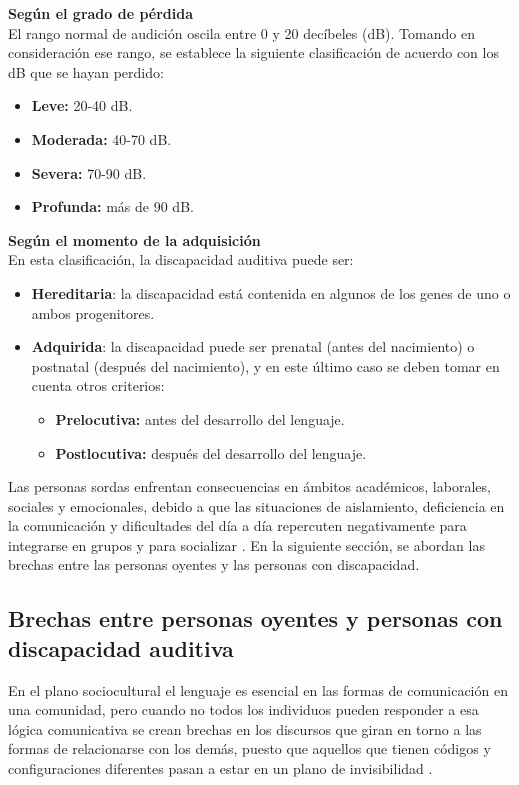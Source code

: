 \newpage
\textbf{Según el grado de pérdida}\\
El rango normal de audición oscila entre 0 y 20 decíbeles (dB). Tomando en consideración ese rango, se establece la siguiente clasificación de acuerdo con los dB que se hayan perdido:

\begin{itemize}
    \item \textbf{Leve:} 20-40 dB.  
    \item \textbf{Moderada:} 40-70 dB.  
    \item \textbf{Severa:} 70-90 dB.  
    \item \textbf{Profunda:} más de 90 dB.  
\end{itemize}

\textbf{Según el momento de la adquisición}\\
En esta clasificación, la discapacidad auditiva puede ser:

\begin{itemize}
    \item \textbf{Hereditaria}: la discapacidad está contenida en algunos de los genes de uno o ambos progenitores.  
    \item \textbf{Adquirida}: la discapacidad puede ser prenatal (antes del nacimiento) o postnatal (después del nacimiento), y en este último caso se deben tomar en cuenta otros criterios:
        \begin{itemize}
        \item \textbf{Prelocutiva:} antes del desarrollo del lenguaje.  
        \item \textbf{Postlocutiva:} después del desarrollo del lenguaje.  
        \end{itemize}
    \end{itemize}

Las personas sordas enfrentan consecuencias en ámbitos académicos, laborales, sociales y emocionales, debido a que las situaciones de aislamiento, deficiencia en la comunicación y dificultades del día a día repercuten negativamente para integrarse en grupos y para socializar \cite{ref29}. En la siguiente sección, se abordan las brechas entre las personas oyentes y las personas con discapacidad.

\subsection{Brechas entre personas oyentes y personas con discapacidad auditiva}
En el plano sociocultural el lenguaje es esencial en las formas de comunicación en una comunidad, pero cuando no todos los individuos pueden responder a esa lógica comunicativa se crean brechas en los discursos que giran en torno a las formas de relacionarse con los demás, puesto que aquellos que tienen códigos y configuraciones diferentes pasan a estar en un plano de invisibilidad \cite{ref32}.\\


